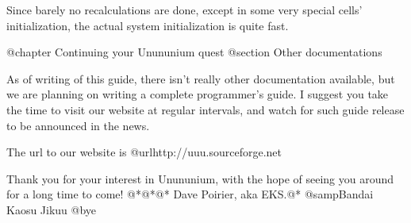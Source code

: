  Since barely no recalculations are done, except in some very special cells'
 initialization, the actual system initialization is quite fast.

@chapter Continuing your Unununium quest
@section Other documentations

 As of writing of this guide, there isn't really other documentation available,
 but we are planning on writing a complete programmer's guide.  I suggest you
 take the time to visit our website at regular intervals, and watch for such
 guide release to be announced in the news.

 The url to our website is @url{http://uuu.sourceforge.net}

 Thank you for your interest in Unununium, with the hope of seeing you around
 for a long time to come!
@*@*@*
 Dave Poirier, aka EKS.@*
 @samp{Bandai Kaosu Jikuu}
@bye

